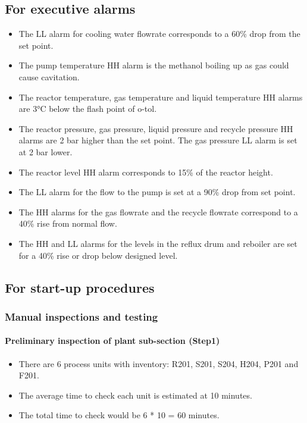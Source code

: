 \subsection{For executive alarms}
\begin{itemize}
    \item The LL alarm for cooling water flowrate corresponds to a 60\% drop from the set point.
    \item The pump temperature HH alarm is the methanol boiling up as gas could cause cavitation.
    \item The reactor temperature, gas temperature and liquid temperature HH alarms are 3°C below the flash point of o-tol.
    \item The reactor pressure, gas pressure, liquid pressure and recycle pressure HH alarms are 2 bar higher than the set point. The gas pressure LL alarm is set at 2 bar lower.
    \item The reactor level HH alarm corresponds to 15\% of the reactor height.
    \item The LL alarm for the flow to the pump is set at a 90\% drop from set point.
    \item The HH alarms for the gas flowrate and the recycle flowrate correspond to a 40\% rise from normal flow.
    \item The HH and LL alarms for the levels in the reflux drum and reboiler are set for a 40\% rise or drop below designed level.
\end{itemize}

\subsection{For start-up procedures}

\subsubsection{Manual inspections and testing}
\paragraph{Preliminary inspection of plant sub-section (Step1)}
    \begin{itemize}
        \item There are 6 process units with inventory: R201, S201, S204, H204, P201 and F201.
        \item The average time to check each unit is estimated at 10 minutes.
        \item The total time to check would be 6 * 10 = 60 minutes.
    \end{itemize}

